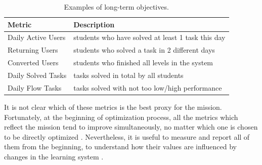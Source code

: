 \begin{table}[htb]
\centering
\caption{Examples of long-term objectives.}
\begin{tabular}{l l}
\toprule
Metric & Description \\
\midrule
Daily Active Users & students who have solved at least 1 task this day \\
Returning Users & students who solved a task in 2 different days \\
Converted Users & students who finished all levels in the system \\
Daily Solved Tasks & tasks solved in total by all students \\
Daily Flow Tasks & tasks solved with not too low/high performance \\
\bottomrule
\end{tabular}
\label{tbl:long-term-metrics}
\end{table}

It is not clear which of these metrics is the best proxy for the mission.
Fortunately, at the beginning of optimization process, all the metrics
which reflect the mission tend to improve simultaneously, no matter which one
is chosen to be directly optimized
\cite[][Rule 12]{google-ml-rules}.
Nevertheless, it is useful to measure and report all of them from the beginning,
to understand how their values are influenced by changes in the learning system
\cite[][Rule 2]{google-ml-rules}.




